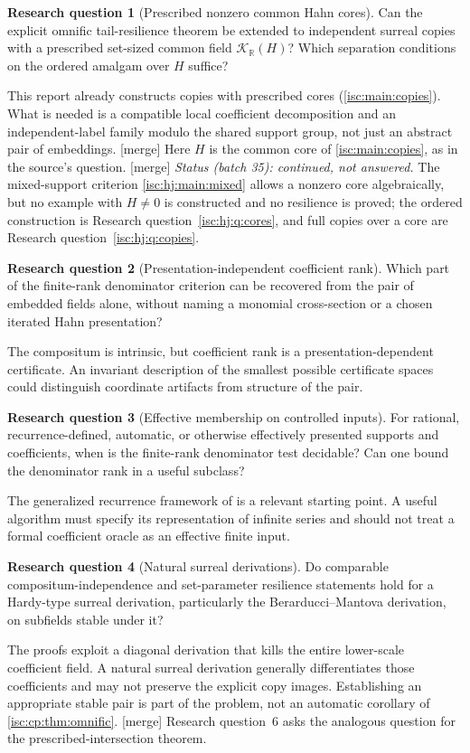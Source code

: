\documentclass[11pt,letterpaper]{article}
\theoremstyle{definition}
\newtheorem{question}{Research question}
\theoremstyle{remark}
\newcommand{\R}{\mathbb R}
\newcommand{\K}[2]{\mathcal K_{#1}(#2)}
\newcommand{\mtag}{\textup{[merge]}}%
\numberwithin{equation}{section}
\begin{document}
\begin{question}[Prescribed nonzero common Hahn cores]\label{isc:cp:q:cores}
Can the explicit omnific tail-resilience theorem be extended to independent
surreal copies with a prescribed set-sized common field $\K{\R}{H}$? Which
separation conditions on the ordered amalgam over $H$ suffice?
\end{question}
This report already constructs copies with prescribed cores
(\cref{isc:main:copies}). What is needed is a compatible local coefficient
decomposition and an independent-label family modulo the shared support
group, not just an abstract pair of embeddings. \mtag{} Here $H$ is the
common core of \cref{isc:main:copies}, as in the source's question.
\mtag{} \emph{Status (batch 35): continued, not answered.} The
mixed-support criterion \cref{isc:hj:main:mixed} allows a nonzero core
algebraically, but no example with $H\ne0$ is constructed and no
resilience is proved; the ordered construction is Research
question~\ref{isc:hj:q:cores}, and full copies over a core are Research
question~\ref{isc:hj:q:copies}.

\begin{question}[Presentation-independent coefficient rank]\label{isc:cp:q:presentation}
Which part of the finite-rank denominator criterion can be recovered from
the pair of embedded fields alone, without naming a monomial cross-section
or a chosen iterated Hahn presentation?
\end{question}
The compositum is intrinsic, but coefficient rank is a
presentation-dependent certificate. An invariant description of the
smallest possible certificate spaces could distinguish coordinate artifacts
from structure of the pair.

\begin{question}[Effective membership on controlled inputs]\label{isc:cp:q:effective}
For rational, recurrence-defined, automatic, or otherwise effectively
presented supports and coefficients, when is the finite-rank denominator
test decidable? Can one bound the denominator rank in a useful subclass?
\end{question}
The generalized recurrence framework of \cite{KKS} is a relevant starting
point. A useful algorithm must specify its representation of infinite
series and should not treat a formal coefficient oracle as an effective
finite input.

\begin{question}[Natural surreal derivations]\label{isc:cp:q:bm}
Do comparable compositum-independence and set-parameter resilience
statements hold for a Hardy-type surreal derivation, particularly the
Berarducci--Mantova derivation, on subfields stable under it?
\end{question}
The proofs exploit a diagonal derivation that kills the entire lower-scale
coefficient field. A natural surreal derivation generally differentiates
those coefficients and may not preserve the explicit copy images.
Establishing an appropriate stable pair is part of the problem, not an
automatic corollary of \cref{isc:cp:thm:omnific}. \mtag{} Research
question~6 asks the analogous question for the prescribed-intersection
theorem.
\end{document}
